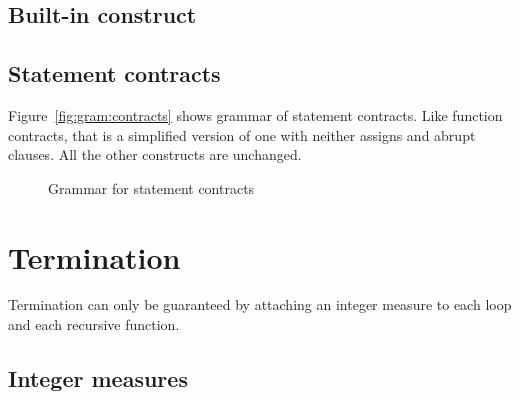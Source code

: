 
\subsection{Built-in construct \texorpdfstring{\at}{\textbackslash{}at}}
\label{sec:at}

\nodiff


\subsection{Statement contracts}
\label{sec:statement_contract}


Figure~\ref{fig:gram:contracts} shows grammar of statement contracts. Like
function contracts, that is a simplified version of \acsl one with neither
assigns and abrupt clauses. All the other constructs are unchanged.

\begin{figure}[htbp]
  \begin{cadre}
    
  \end{cadre}
  \caption{Grammar for statement contracts}
  \label{fig:gram:stcontracts}
\end{figure}


\section{Termination}
\label{sec:termination}


Termination can only be guaranteed by attaching an integer measure to each loop
and each recursive function.


\subsection{Integer measures}
\label{sec:integermeasures}

